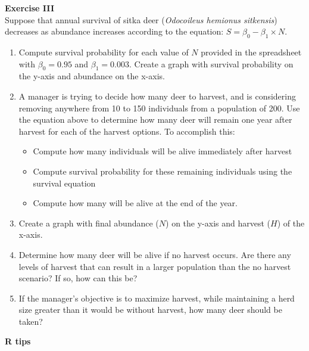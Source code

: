 \documentclass[12pt]{article}\usepackage[]{graphicx}\usepackage[]{color}
\begin{document}

\newpage


{\bf Exercise III \\}
Suppose that annual survival of sitka deer ({\it Odocoileus hemionus
  sitkensis}) decreases as abundance increases according to the
equation: $S = \beta_0 - \beta_1 \times N$.

\begin{enumerate}
  \item Compute survival probability for each value of $N$ provided in
    the spreadsheet with $\beta_0=0.95$ and $\beta_1=0.003$. Create a
    graph with survival probability on the y-axis and abundance on the
    x-axis.
  \item A manager is trying to decide how many deer to harvest, and is
    considering removing anywhere from 10 to 150 individuals from a
    population of 200. Use the equation above to determine how many
    deer will remain one year after harvest for each of the harvest
    options. To accomplish this:
  \begin{itemize}
    \item Compute how many individuals will be alive immediately after
      harvest
    \item Compute survival probability for these remaining individuals
      using the survival equation
    \item Compute how many will be alive at the end of the year.
  \end{itemize}
  \item Create a graph with final abundance ($N$) on the y-axis and
    harvest ($H$) of the x-axis. %
  \item Determine how many deer will be alive if no harvest
    occurs. Are there any levels of harvest that can result in a
    larger population than the no harvest scenario? If so, how can
    this be?
  \item If the manager's objective is to maximize harvest, while
    maintaining a herd size greater than it would be without harvest,
    how many deer should be taken?
\end{enumerate}


\newpage

{\bf R tips \\}
\end{document}
